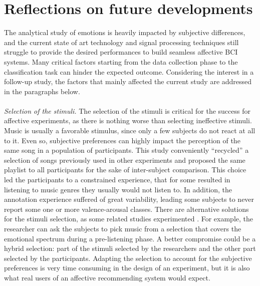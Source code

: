 \section{Reflections on future developments}
\label{sec:future_developments}
The analytical study of emotions is heavily impacted by subjective differences, and the current state of art technology and signal processing techniques still struggle to provide the desired performances to build seamless affective \ac{BCI} systems. Many critical factors starting from the data collection phase to the classification task can hinder the expected outcome. Considering the interest in a follow-up study, the factors that mainly affected the current study are addressed in the paragraphs below. 
\\
\\
\emph{Selection of the stimuli.} The selection of the stimuli is critical for the success for affective experiments, as there is nothing worse than selecting ineffective stimuli. Music is usually a favorable stimulus, since only a few subjects do not react at all to it. Even so, subjective preferences can highly impact the perception of the same song in a population of participants. This study conveniently “recycled” a selection of songs previously used in other experiments and proposed the same playlist to all participants for the sake of inter-subject comparison. This choice led the participants to a constrained experience, that for some resulted in listening to music genres they usually would not listen to. In addition, the annotation experience suffered of great variability, leading some subjects to never report some one or more valence-arousal classes. There are alternative solutions for the stimuli selection, as some related studies experimented \cite{thammasan_continuous_2016}. For example, the researcher can ask the subjects to pick music from a selection that covers the emotional spectrum during a pre-listening phase. A better compromise could be a hybrid selection: part of the stimuli selected by the researchers and the other part selected by the participants. Adapting the selection to account for the subjective preferences is very time consuming in the design of an experiment, but it is also what real users of an affective recommending system would expect.
\\
\\

